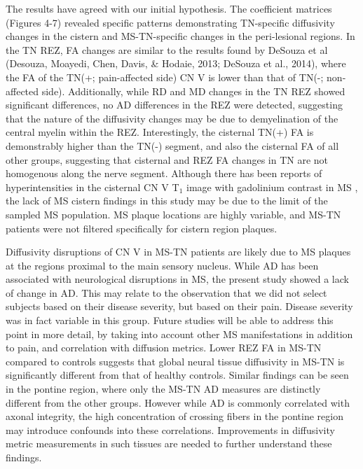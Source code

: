 The results have agreed with our initial hypothesis. The coefficient matrices (Figures 4-7) revealed specific patterns demonstrating TN-specific diffusivity changes in the cistern and MS-TN-specific changes in the peri-lesional regions. In the TN REZ, FA changes are similar to the results found by DeSouza et al (Desouza, Moayedi, Chen, Davis, \& Hodaie, 2013; DeSouza et al., 2014), where the FA of the TN(+; pain-affected side) CN V is lower than that of TN(-; non-affected side). Additionally, while RD and MD changes in the TN REZ showed significant differences, no AD differences in the REZ were detected, suggesting that the nature of the diffusivity changes may be due to demyelination of the central myelin within the REZ. Interestingly, the cisternal TN(+) FA is demonstrably higher than the TN(-) segment, and also the cisternal FA of all other groups, suggesting that cisternal and REZ FA changes in TN are not homogenous along the nerve segment. Although there has been reports of hyperintensities in the cisternal CN V T$_{1}$ image with gadolinium contrast in MS \cite{VanderMeijs2002}, the lack of MS cistern findings in this study may be due to the limit of the sampled MS population. MS plaque locations are highly variable, and MS-TN patients were not filtered specifically for cistern region plaques. 

Diffusivity disruptions of CN V in MS-TN patients are likely due to MS plaques at the regions proximal to the main sensory nucleus. While AD has been associated with neurological disruptions in MS\cite{Budde2009,Kim2006}, the present study showed a lack of change in AD. This may relate to the observation that we did not select subjects based on their disease severity, but based on their pain. Disease severity was in fact variable in this group. Future studies will be able to address this point in more detail, by taking into account other MS manifestations in addition to pain, and correlation with diffusion metrics. Lower REZ FA in MS-TN compared to controls suggests that global neural tissue diffusivity in MS-TN is significantly different from that of healthy controls. Similar findings can be seen in the pontine region, where only the MS-TN AD measures are distinctly different from the other groups. However while AD is commonly correlated with axonal integrity, the high concentration of crossing fibers in the pontine region may introduce confounds into these correlations. Improvements in diffusivity metric measurements in such tissues are needed to further understand these findings. 


